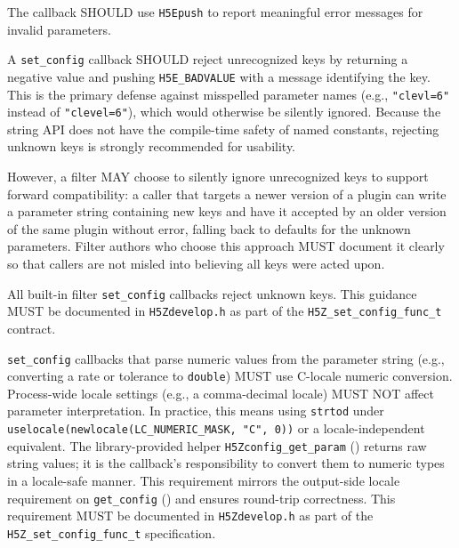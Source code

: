 \documentclass[../HDF5_RFC.tex]{subfiles}
\begin{document}
The callback SHOULD use \texttt{H5Epush} to report meaningful error messages for
invalid parameters.

A \texttt{set\_config} callback SHOULD reject unrecognized keys by returning a
negative value and pushing \texttt{H5E\_BADVALUE} with a message identifying the
key.  This is the primary defense against misspelled parameter names (e.g.,
\texttt{"clevl=6"} instead of \texttt{"clevel=6"}), which would otherwise be
silently ignored.  Because the string API does not have the compile-time safety
of named constants, rejecting unknown keys is strongly recommended for
usability.

However, a filter MAY choose to silently ignore unrecognized keys to support
forward compatibility: a caller that targets a newer version of a plugin can
write a parameter string containing new keys and have it accepted by an older
version of the same plugin without error, falling back to defaults for the
unknown parameters.  Filter authors who choose this approach MUST document it
clearly so that callers are not misled into believing all keys were acted upon.

All built-in filter \texttt{set\_config} callbacks reject unknown keys.  This
guidance MUST be documented in \texttt{H5Zdevelop.h} as part of the
\texttt{H5Z\_set\_config\_func\_t} contract.

\texttt{set\_config} callbacks that parse numeric values from the parameter
string (e.g., converting a rate or tolerance to \texttt{double}) MUST use
C-locale numeric conversion. Process-wide locale settings (e.g., a
comma-decimal locale) MUST NOT affect parameter interpretation. In practice,
this means using \texttt{strtod} under \texttt{uselocale(newlocale(LC\_NUMERIC\_MASK,
"C", 0))} or a locale-independent equivalent. The library-provided helper
\texttt{H5Zconfig\_get\_param} () returns raw
string values; it is the callback's responsibility to convert them to numeric
types in a locale-safe manner. This requirement mirrors the output-side locale
requirement on \texttt{get\_config} () and ensures
round-trip correctness. This requirement MUST be documented in
\texttt{H5Zdevelop.h} as part of the \texttt{H5Z\_set\_config\_func\_t} specification.

\end{document}
